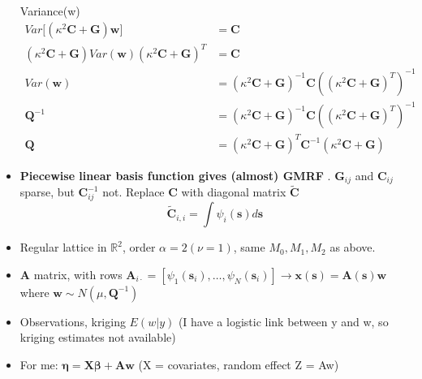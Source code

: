 \documentclass{article}
\begin{document}
\begin{itemize}
Variance(w)
\begin{align}
Var \big[ \left(\kappa^{2} \pmb{C} + \pmb{G} \right) \pmb{w} \big] & = \pmb{C} \\
\left( \kappa^{2} \pmb{C} + \pmb{G} \right) Var(\pmb{w}) \left( \kappa^{2} \pmb{C} + \pmb{G} \right)^{T} & = \pmb{C} \\
Var(\pmb{w}) & = \left( \kappa^{2} \pmb{C} + \pmb{G} \right)^{-1} \pmb{C} \left( \left( \kappa^{2} \pmb{C} + \pmb{G} \right)^{T} \right)^{-1} \\
\pmb{Q}^{-1} & = \left( \kappa^{2} \pmb{C} + \pmb{G} \right)^{-1} \pmb{C} \left( \left( \kappa^{2} \pmb{C} + \pmb{G} \right)^{T} \right)^{-1} \\
\pmb{Q} & = \left( \kappa^{2} \pmb{C} + \pmb{G} \right)^{T} \pmb{C}^{-1} \left( \kappa^{2} \pmb{C} + \pmb{G} \right)
\end{align}
\item {\bf Piecewise linear basis function gives (almost) GMRF} \citep{Lindgren2011}. $\pmb{G}_{ij}$ and $\pmb{C}_{ij}$ sparse, but $\pmb{C}_{ij}^{-1}$ not. Replace $\pmb{C}$ with diagonal matrix $\widetilde{\pmb{C}}$
$$ \widetilde{\pmb{C}}_{i,i} = \int \psi_{i}(\pmb{s}) d\pmb{s} $$
\item Regular lattice in $\mathbb{R}^{2}$, order $\alpha = 2 (\nu = 1)$, same $M_{0}, M_{1}, M_{2}$ as above.
\item $\pmb{A}$ matrix, with rows $\pmb{A}_{i\cdot} = [\psi_{1}(\pmb{s}_{i}), \dots, \psi_{N}(\pmb{s}_{i}) ] \rightarrow \pmb{x}(\pmb{s}) = \pmb{A}(\pmb{s})\pmb{w}$ where $\pmb{w} \sim N(\mu, \pmb{Q}^{-1})$
\item Observations, kriging $E(w|y)$ (I have a logistic link between y and w, so kriging estimates not available)
\item For me: $\pmb{\eta} = \pmb{X\beta} + \pmb{Aw}$ (X = covariates, random effect Z = Aw)
\end{itemize}
\end{document}
